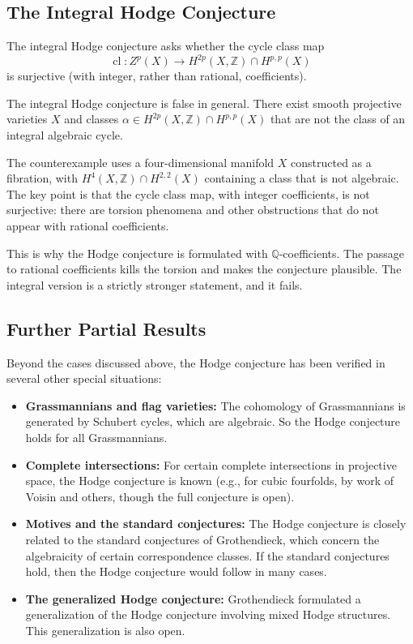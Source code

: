 \subsection{The Integral Hodge Conjecture}
\label{sec:integral}

The integral Hodge conjecture asks whether the cycle class map
\[
\operatorname{cl}: Z^p(X) \to H^{2p}(X, \mathbb{Z}) \cap H^{p,p}(X)
\]
is surjective (with integer, rather than rational, coefficients).

\begin{theorem}
The integral Hodge conjecture is false in general. There exist smooth projective varieties $X$ and classes $\alpha \in H^{2p}(X, \mathbb{Z}) \cap H^{p,p}(X)$ that are not the class of an integral algebraic cycle.
\end{theorem}

The counterexample uses a four-dimensional manifold $X$ constructed as a fibration, with $H^4(X, \mathbb{Z}) \cap H^{2,2}(X)$ containing a class that is not algebraic. The key point is that the cycle class map, with integer coefficients, is not surjective: there are torsion phenomena and other obstructions that do not appear with rational coefficients.

\begin{remark}
This is why the Hodge conjecture is formulated with $\mathbb{Q}$-coefficients. The passage to rational coefficients kills the torsion and makes the conjecture plausible. The integral version is a strictly stronger statement, and it fails.
\end{remark}

\subsection{Further Partial Results}

Beyond the cases discussed above, the Hodge conjecture has been verified in several other special situations:

\begin{itemize}
\item \textbf{Grassmannians and flag varieties:} The cohomology of Grassmannians is generated by Schubert cycles, which are algebraic. So the Hodge conjecture holds for all Grassmannians.
\item \textbf{Complete intersections:} For certain complete intersections in projective space, the Hodge conjecture is known (e.g., for cubic fourfolds, by work of Voisin and others, though the full conjecture is open).
\item \textbf{Motives and the standard conjectures:} The Hodge conjecture is closely related to the standard conjectures of Grothendieck, which concern the algebraicity of certain correspondence classes. If the standard conjectures hold, then the Hodge conjecture would follow in many cases.
\item \textbf{The generalized Hodge conjecture:} Grothendieck formulated a generalization of the Hodge conjecture involving mixed Hodge structures. This generalization is also open.
\end{itemize}

